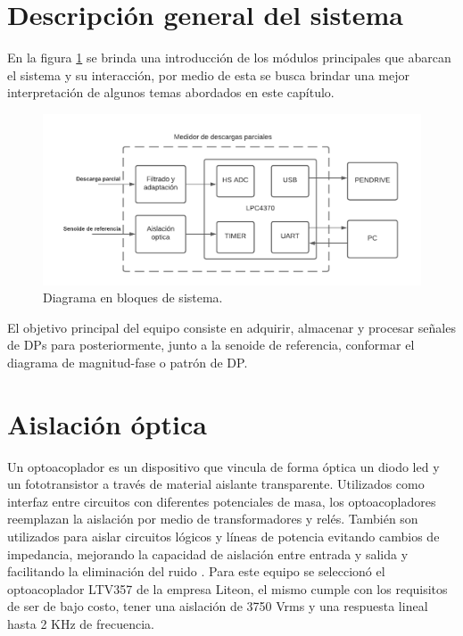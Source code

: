 \section{Descripción general del sistema}

En la figura \ref{fig:bloques} se brinda una introducción de los módulos principales que abarcan el sistema y su interacción, por medio de esta se busca brindar una mejor interpretación de algunos temas abordados en este capítulo.

\begin{figure}[ht]
	\centering
	\includegraphics[width=\textwidth]{./Figures/bloques.png}
	\caption{Diagrama en bloques de sistema.}
	\label{fig:bloques}
\end{figure}

El objetivo principal del equipo consiste en adquirir, almacenar y procesar señales de DPs para posteriormente, junto a la senoide de referencia, conformar el diagrama de magnitud-fase o patrón de DP.

\section{Aislación óptica}
Un optoacoplador es un dispositivo que vincula de forma óptica un diodo led y un fototransistor a través  de material aislante transparente. Utilizados como interfaz entre circuitos con diferentes potenciales de masa, los optoacopladores reemplazan la aislación por medio de transformadores y relés. También son utilizados para aislar circuitos lógicos y líneas de potencia evitando cambios de impedancia, mejorando la capacidad de aislación entre entrada y salida y facilitando la eliminación del ruido \citep{opto:appnote}. Para este equipo se seleccionó el optoacoplador LTV357 \citep{opto:ltv357} de la empresa Liteon, el mismo cumple con los requisitos de ser de bajo costo, tener una aislación de 3750 Vrms y una respuesta lineal hasta 2 KHz de frecuencia.

